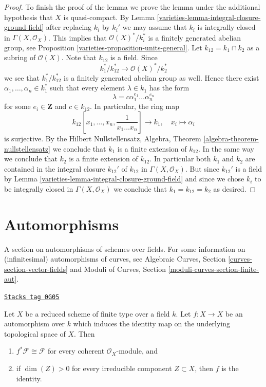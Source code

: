 \begin{proof}
\medskip\noindent
To finish the proof of the lemma we prove the lemma under the
additional hypothesis that $X$ is quasi-compact. By
Lemma \ref{varieties-lemma-integral-closure-ground-field}
after replacing $k_i$ by $k_i'$
we may assume that $k_i$ is integrally closed in $\Gamma(X, \mathcal{O}_X)$.
This implies that $\mathcal{O}(X)^*/k_i^*$ is a finitely generated
abelian group, see
Proposition \ref{varieties-proposition-units-general}.
Let $k_{12} = k_1 \cap k_2$ as a subring of $\mathcal{O}(X)$.
Note that $k_{12}$ is a field. Since
$$
k_1^*/k_{12}^* \longrightarrow \mathcal{O}(X)^*/k_2^*
$$
we see that $k_1^*/k_{12}^*$ is a finitely generated abelian group as well.
Hence there exist $\alpha_1, \ldots, \alpha_n \in k_1^*$ such that
every element $\lambda \in k_1$ has the form
$$
\lambda = c \alpha_1^{e_1} \ldots \alpha_n^{e_n}
$$
for some $e_i \in \mathbf{Z}$ and $c \in k_{12}$.
In particular, the ring map
$$
k_{12}[x_1, \ldots, x_n, \frac{1}{x_1 \ldots x_n}] \longrightarrow k_1, \quad
x_i \longmapsto \alpha_i
$$
is surjective. By the Hilbert Nullstellensatz,
Algebra, Theorem \ref{algebra-theorem-nullstellensatz}
we conclude that $k_1$ is a finite extension of $k_{12}$.
In the same way we conclude that $k_2$ is a finite extension of $k_{12}$.
In particular both $k_1$ and $k_2$ are contained in the integral closure
$k_{12}'$ of $k_{12}$ in $\Gamma(X, \mathcal{O}_X)$. But since $k_{12}'$
is a field by
Lemma \ref{varieties-lemma-integral-closure-ground-field}
and since we chose $k_i$ to be integrally closed in $\Gamma(X, \mathcal{O}_X)$
we conclude that $k_1 = k_{12} = k_2$ as desired.
\end{proof}

\section{Automorphisms}
\label{varieties-section-automorphisms}
A section on automorphisms of schemes over fields. For some information
on (infinitesimal) automorphisms of curves, see
Algebraic Curves, Section \ref{curves-section-vector-fields}
and
Moduli of Curves, Section \ref{moduli-curves-section-finite-aut}.

\begin{lemma}[Automorphism]
\label{varieties-lemma-automorphism}
\href{https://stacks.math.columbia.edu/tag/0G05}{\texttt{Stacks tag 0G05}}

Let $X$ be a reduced scheme of finite type over a field $k$. Let $f : X \to X$
be an automorphism over $k$ which induces the identity map on the underlying
topological space of $X$. Then
\begin{enumerate}
\item $f^*\mathcal{F} \cong \mathcal{F}$ for every coherent
$\mathcal{O}_X$-module, and
\item if $\dim(Z) > 0$ for every irreducible component $Z \subset X$,
then $f$ is the identity.
\end{enumerate}
\end{lemma}

